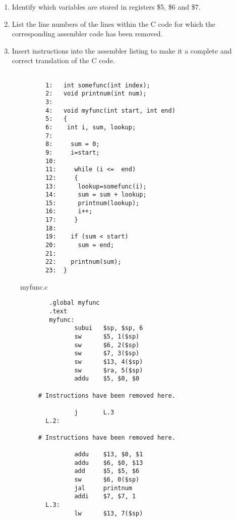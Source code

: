 \documentclass[a4paper,10pt]{article}
\begin{document}
\begin{enumerate}
\begin{enumerate}

\item Identify which variables are stored in registers \$5, \$6 and \$7.
\item List the line numbers of the lines within the C code for which the corresponding assembler code has been removed.
\item Insert instructions into the assembler listing to make it a complete and correct translation of the C code.
\end{enumerate}

\begin{figure}[ht]
{\small
\begin{verbatim}

       1:   int somefunc(int index);
       2:   void printnum(int num);
       3:   
       4:   void myfunc(int start, int end)
       5:   {
       6:    int i, sum, lookup;
       7:   
       8:     sum = 0;
       9:     i=start;
       10:  
       11:     while (i <=  end)
       12:     {
       13:      lookup=somefunc(i);
       14:      sum = sum + lookup;
       15:      printnum(lookup);
       16:      i++;
       17:     }
       18:  
       19:    if (sum < start)
       20:      sum = end;
       21:
       22:    printnum(sum);
       23:  }
\end{verbatim}
}
\caption{myfunc.c}
\label{fig:c_function}

\end{figure}

\begin{figure}[ht]
{\small
\begin{verbatim}
        .global myfunc
        .text
        myfunc:
               subui   $sp, $sp, 6
               sw      $5, 1($sp)
               sw      $6, 2($sp)
               sw      $7, 3($sp)
               sw      $13, 4($sp)
               sw      $ra, 5($sp)
               addu    $5, $0, $0

     # Instructions have been removed here.

               j       L.3
       L.2:

     # Instructions have been removed here.

               addu    $13, $0, $1
               addu    $6, $0, $13
               add     $5, $5, $6
               sw      $6, 0($sp)
               jal     printnum
               addi    $7, $7, 1
       L.3:
               lw      $13, 7($sp)


\end{verbatim}}
\end{figure}
\end{enumerate}
\end{document}
